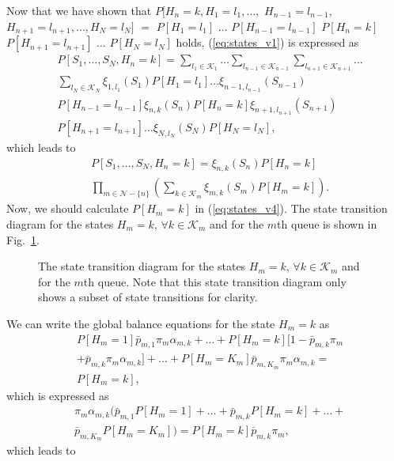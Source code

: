 \documentclass[conference]{IEEEtran}
\newcommand{\Kset}{\mathcal{K}}
\newcommand{\Nset}{\mathcal{N}}
\begin{document}
Now that we have shown that $P[H_{n}=k,  H_{1}=l_{1}, \ldots,$ $H_{n-1}=l_{n-1},$ $H_{n+1}=l_{n+1}, \ldots,  H_{N}=l_{N}]$ $=$ $P[H_1=l_1]$ $\ldots$ $P[H_{n-1}=l_{n-1}]$ $P[H_n=k]$ $P[H_{n+1}=l_{n+1}]$ $\ldots$ $P[H_{N}=l_{N}]$ holds, (\ref{eq:states_v1}) is expressed as
\begin{align} \label{eq:states_v2}
& P[S_1,\ldots,S_N, H_n=k]  = \sum_{l_1 \in \Kset_{1}} \ldots \sum_{l_{n-1} \in \Kset_{n-1}} \sum_{l_{n+1} \in \Kset_{n+1}} \ldots \nonumber \\
& \sum_{l_N \in \Kset_{N}} {\xi_{1,l_1}(S_1)}P[H_1=l_1] \ldots {\xi_{n-1,l_{n-1}}(S_{n-1})} \nonumber \\
&  P[H_{n-1}=l_{n-1}] {\xi_{n,k}(S_{n})} P[H_{n}=k] {\xi_{n+1,l_{n+1}}(S_{n+1})} \nonumber \\
&  P[H_{n+1}=l_{n+1}] \ldots {\xi_{N,l_{N}}(S_{N})} P[H_{N}=l_{N}],  
\end{align} 
which leads to 
\begin{align} \label{eq:states_v4}
& P[S_1,\ldots,S_N, H_n=k]  =  \xi_{n,k}(S_n)P[H_n=k] \nonumber \\
& \prod_{m \in \Nset-\{n\}} \left( \sum_{k \in \Kset_{m}} \xi_{m,k}(S_{m}) P[H_{m}=k] \right). 
\end{align} Now, we should calculate $P[H_{m}=k]$ in (\ref{eq:states_v4}). The state transition diagram for the states $H_{m}=k$, $\forall k \in \Kset_{m}$ and for the $m$th queue is shown in Fig.~\ref{fig:app_Km_flows}. 
\begin{figure}
\vspace{5pt}
\centering
{} 
\vspace{-5pt}
\caption{The state transition diagram for the states $H_{m}=k$, $\forall k \in \Kset_{m}$ and for the $m$th queue. Note that this state transition diagram only shows a subset of state transitions for clarity.}
\label{fig:app_Km_flows}
\vspace{-5pt}
\end{figure}
We can write the global balance equations for the state $H_m=k$ as 
\begin{align}
& P[H_m=1] \bar{p}_{m,1}\pi_{m}\alpha_{m,k} + \ldots + P[H_m=k][1 - \bar{p}_{m,k}\pi_{m} \nonumber \\
& + \bar{p}_{m,k}\pi_{m}\alpha_{m,k}] + \ldots + P[H_m=K_m] \bar{p}_{m,K_m}\pi_{m}\alpha_{m,k} = \nonumber \\
&  P[H_m=k], 
\end{align} which is expressed as
\begin{align}
& \pi_{m} \alpha_{m,k} ( \bar{p}_{m,1}P[H_m=1] + \ldots + \bar{p}_{m,k} P[H_m=k] + \ldots + \nonumber \\
& \bar{p}_{m,K_m} P[H_m=K_m]  ) = P[H_m = k] \bar{p}_{m,k} \pi_{m}, 
\end{align} which leads to 
\end{document}
